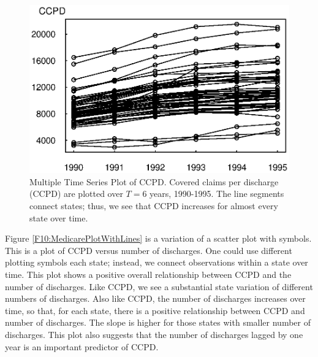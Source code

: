 \begin{figure}[htp]
  \begin{center}
    \includegraphics[width=.7\textwidth]
        {Chapter10LongData//F10MedicareTSPlot.eps}
    \caption{\label{F10:MedicareTSPlot} \small Multiple Time Series Plot of CCPD.
    Covered claims per discharge (CCPD) are plotted over $T=6$ years, 1990-1995.
    The line segments connect states; thus, we see that CCPD increases for almost every state over time.}
  \end{center}
\end{figure}



Figure \ref{F10:MedicarePlotWithLines} is a variation of a scatter
plot with symbols. This is a plot of CCPD versus number of
discharges. One could use different plotting symbols each state;
instead, we connect observations within a state over time. This plot
shows a positive overall relationship between CCPD and the number of
discharges. Like CCPD, we see a substantial state variation of
different numbers of discharges. Also like CCPD, the number of
discharges increases over time, so that, for each state, there is a
positive relationship between CCPD and number of discharges. The
slope is higher for those states with smaller number of discharges.
This plot also suggests that the number of discharges lagged by one
year is an important predictor of CCPD.

